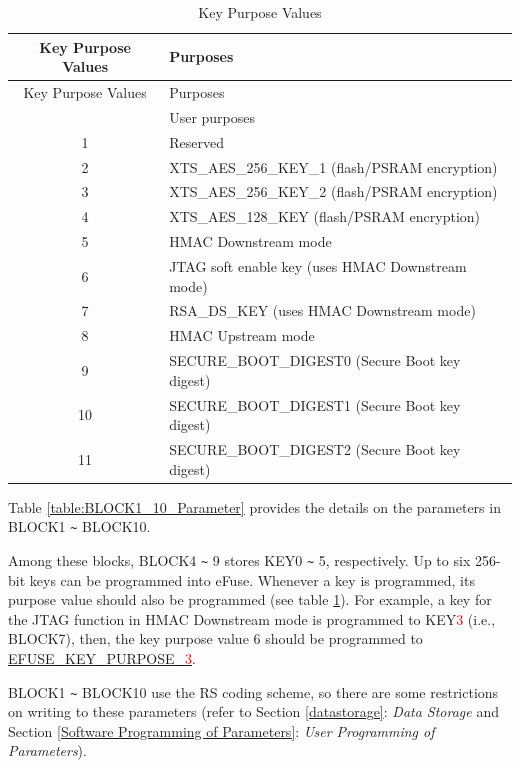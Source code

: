\documentclass[main\_\_EN.tex]{subfiles}
\begin{document}
\begin{longtable}[c]{|c|p{10cm}|}
\caption{Key Purpose Values}
\label{table: key_purpose}
    \\\hline
    \rowcolor{lightgray}
  Key Purpose Values &Purposes\\
    \endfirsthead
    \hline
    \rowcolor{lightgray}
   Key Purpose Values &Purposes\\
    \endhead
    \endfoot
    \endlastfoot
    \hline
0 & User purposes\\\hline
1&  Reserved \\\hline
2& XTS\_AES\_256\_KEY\_1 (flash/PSRAM encryption)\\\hline
3& XTS\_AES\_256\_KEY\_2 (flash/PSRAM encryption)\\ \hline
4 & XTS\_AES\_128\_KEY (flash/PSRAM encryption)\\\hline
5& HMAC Downstream mode\\\hline
6& JTAG soft enable key (uses HMAC Downstream mode)\\\hline
7 & RSA\_DS\_KEY (uses HMAC Downstream mode)\\\hline
8 & HMAC Upstream mode\\\hline
9& SECURE\_BOOT\_DIGEST0 (Secure Boot key digest)\\\hline
10 & SECURE\_BOOT\_DIGEST1 (Secure Boot key digest)\\\hline
11& SECURE\_BOOT\_DIGEST2 (Secure Boot key digest) \\\hline
\end{longtable}

Table  \ref{table:BLOCK1_10_Parameter} provides the details on the parameters in BLOCK1 \verb+~+ BLOCK10.



Among these blocks, BLOCK4 \verb+~+ 9 stores KEY0 \verb+~+ 5, respectively. Up to six 256-bit keys can be programmed into eFuse. Whenever a key is programmed, its purpose value should also be programmed (see table \ref{table: key_purpose}). For example, a key for the JTAG function in HMAC Downstream mode is programmed to KEY\textcolor{red}{3} (i.e., BLOCK7), then, the key purpose value 6 should be programmed to \hyperref[fielddesc:EFUSEKEYPURPOSE3]{EFUSE\_KEY\_PURPOSE\_\textcolor{red}{3}}.

BLOCK1 \verb+~+ BLOCK10 use the RS coding scheme, so there are some restrictions on writing to these parameters (refer to Section \ref{datastorage}: \textit{Data Storage} and Section \ref{Software Programming of Parameters}: \textit{User Programming of Parameters}).
\end{document}

